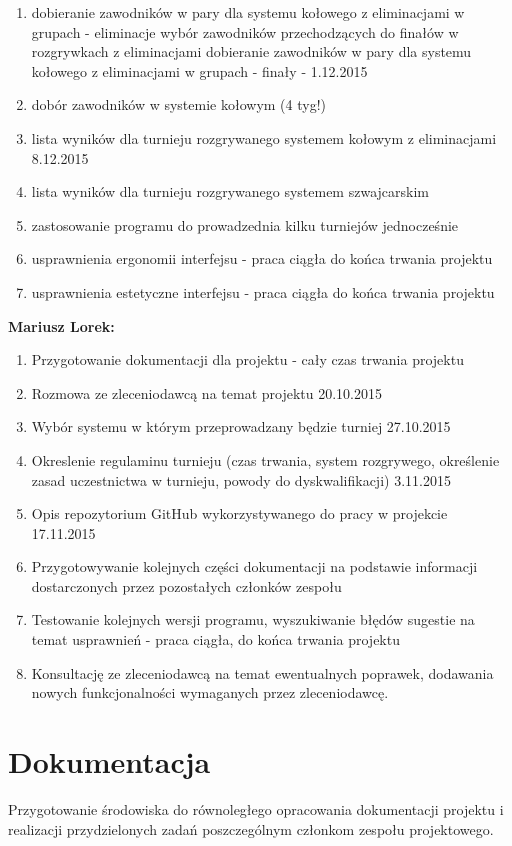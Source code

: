 \begin{enumerate}
\item dobieranie zawodników w pary dla systemu kołowego z eliminacjami w grupach - eliminacje
wybór zawodników przechodzących do finałów w rozgrywkach z eliminacjami
dobieranie zawodników w pary dla systemu kołowego z eliminacjami w grupach - finały - 1.12.2015
\item dobór zawodników w systemie kołowym (4 tyg!) 
\item lista wyników dla turnieju rozgrywanego systemem kołowym z eliminacjami 8.12.2015
\item lista wyników dla turnieju rozgrywanego systemem szwajcarskim 
\item zastosowanie programu do prowadzednia kilku turniejów jednocześnie
\item usprawnienia ergonomii interfejsu - praca ciągła do końca trwania projektu
\item usprawnienia estetyczne interfejsu - praca ciągła do końca trwania projektu
\end{enumerate}

\textbf{Mariusz Lorek:}
\begin{enumerate}
	\item Przygotowanie dokumentacji dla projektu - cały czas trwania projektu
	\item Rozmowa ze zleceniodawcą na temat projektu 20.10.2015
	\item Wybór systemu w którym przeprowadzany będzie turniej 27.10.2015
	\item Okreslenie regulaminu turnieju (czas trwania,  system rozgrywego, określenie zasad uczestnictwa w turnieju, powody do dyskwalifikacji) 3.11.2015
	\item Opis repozytorium GitHub wykorzystywanego do pracy w projekcie 17.11.2015
	\item Przygotowywanie kolejnych części dokumentacji na podstawie informacji dostarczonych przez pozostałych członków zespołu
	\item Testowanie kolejnych wersji  programu, wyszukiwanie błędów sugestie na temat usprawnień - praca ciągła, do końca trwania projektu
	\item Konsultację ze zleceniodawcą na temat ewentualnych poprawek, dodawania nowych funkcjonalności wymaganych przez zleceniodawcę. 

\end{enumerate}


\section{Dokumentacja}
Przygotowanie środowiska do równoległego opracowania dokumentacji projektu i realizacji przydzielonych zadań poszczególnym członkom zespołu projektowego.

